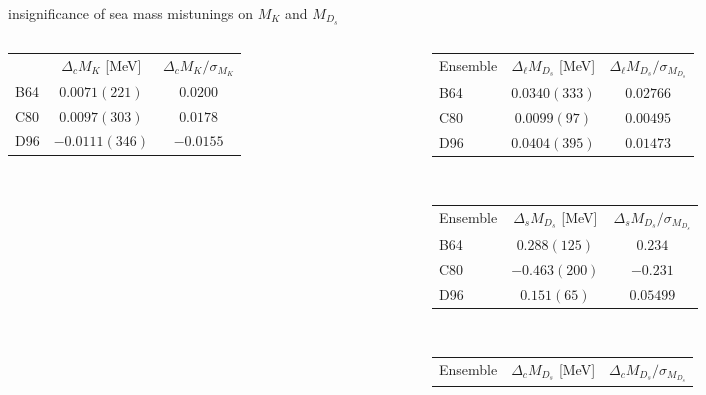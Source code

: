 \documentclass[xcolor={dvipsnames,table}]{beamer}
\begin{document}
\begin{frame}{insignificance of sea mass mistunings on $M_K$ and $M_{D_s}$}
\begin{columns}
\begin{column}{0.5\textwidth}
\begin{center}
\begin{tabular}{l|c|c}
              & $\Delta_{c}M_{K}$ [MeV]
              & $\Delta_{c}M_{K}/\sigma_{M_{K}}$             \\
          B64 & $0.0071(221)$                    & $0.0200$  \\
          C80 & $0.0097(303)$                    & $0.0178$  \\
          D96 & $-0.0111(346)$                   & $-0.0155$ \\
        \end{tabular}
      \end{center}
    \end{column}
    \begin{column}{0.5\textwidth}
      \begin{center}
        \begin{tabular}{l|c|c}
          Ensemble
              & $\Delta_{\ell}M_{D_s}$ [MeV]
              & $\Delta_{\ell}M_{D_s}/\sigma_{M_{D_s}}$             \\
          B64 & $0.0340(333)$                           & $0.02766$ \\
          C80 & $0.0099(97)$                            & $0.00495$ \\
          D96 & $0.0404(395)$                           & $0.01473$ \\
        \end{tabular}
        \vspace*{0.2cm}\,
        \\
        \centering
        \begin{tabular}{l|c|c}
          Ensemble
              & $\Delta_{s}M_{D_s}$ [MeV]
              & $\Delta_{s}M_{D_s}/\sigma_{M_{D_s}}$             \\
          B64 & $0.288(125)$                         & $0.234$   \\
          C80 & $-0.463(200)$                        & $-0.231$  \\
          D96 & $0.151(65)$                          & $0.05499$ \\
        \end{tabular}
        \vspace*{0.2cm}\,
        \\
        \centering
        \begin{tabular}{l|c|c}
          Ensemble
              & $\Delta_{c}M_{D_s}$ [MeV]
              & $\Delta_{c}M_{D_s}/\sigma_{M_{D_s}}$             \\

\end{tabular}
\end{center}
\end{column}
\end{columns}
\end{frame}
\end{document}
